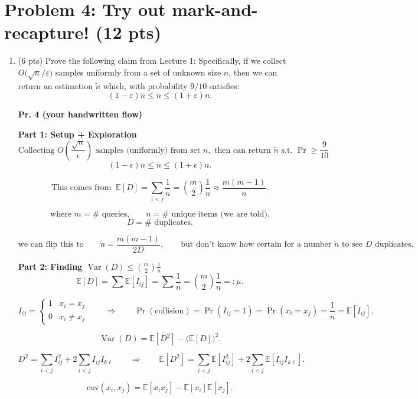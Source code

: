 \documentclass[11pt]{article}
\begin{document}
\section*{Problem 4: Try out mark-and-recapture! (12 pts)}
\begin{enumerate}[label=\arabic*.]
	\item (6 pts) Prove the following claim from Lecture 1: Specifically, if we collect $O\big(\sqrt{n}/\varepsilon\big)$ samples uniformly from a set of unknown size $n$, then we can return an estimation $\tilde n$ which, with probability $9/10$ satisfies:
	\[
	(1-\varepsilon)n \le \tilde n \le (1+\varepsilon)n.
	\]

	\textbf{Pr. 4 (your handwritten flow)}

	\textbf{Part 1: Setup + Exploration}
	\[
	\text{Collecting } O\!\left(\frac{\sqrt{n}}{\epsilon}\right)\text{ samples (uniformly) from set } n,
	\text{ then can return } \tilde n \text{ s.t. } \Pr \ge \frac{9}{10}
	\]
	\[
	(1-\epsilon)n \le \tilde n \le (1+\epsilon)n.
	\]

	\[
	\text{This comes from } \ \mathbb{E}[D]
	= \sum_{i<j}\frac{1}{n}
	= \binom{m}{2}\frac{1}{n}
	\approx \frac{m(m-1)}{n}.
	\]

	\[
	\text{where } m=\#\text{ queries,} \qquad n=\#\text{ unique items (we are told).}
	\]
	\[
	D=\#\text{ duplicates.}
	\]

	\[
	\text{we can flip this to}\qquad
	\tilde n=\frac{m(m-1)}{2D},
	\qquad
	\text{but don't know how certain for a number }\tilde n\text{ to see }D\text{ duplicates.}
	\]

	\textbf{Part 2: Finding $\operatorname{Var}(D) \le \binom{m}{2}\frac{1}{n}$}
	\[
	\mathbb{E}[D]=\sum \mathbb{E}[I_{ij}]
	=\sum \frac{1}{n}
	=\binom{m}{2}\frac{1}{n}
	=:\mu.
	\]

	\[
	I_{ij}=
	\begin{cases}
	1 & x_i=x_j\\
	0 & x_i\ne x_j
	\end{cases}
	\qquad\Rightarrow\qquad
	\Pr(\text{collision})=\Pr(I_{ij}=1)=\Pr(x_i=x_j)=\frac{1}{n}=\mathbb{E}[I_{ij}].
	\]

	\[
	\operatorname{Var}(D)=\mathbb{E}[D^2]-\bigl(\mathbb{E}[D]\bigr)^2.
	\]

	\[
	D^2=\sum_{i<j} I_{ij}^2 + 2\sum_{i<j} I_{ij}I_{k\ell}
	\qquad\Rightarrow\qquad
	\mathbb{E}[D^2]=\sum_{i<j}\mathbb{E}[I_{ij}^2]+2\sum_{i<j}\mathbb{E}[I_{ij}I_{k\ell}].
	\]

	\[
	\text{cov}(x_i,x_j)=\mathbb{E}[x_ix_j]-\mathbb{E}[x_i]\mathbb{E}[x_j].
	\]


\end{enumerate}
\end{document}

